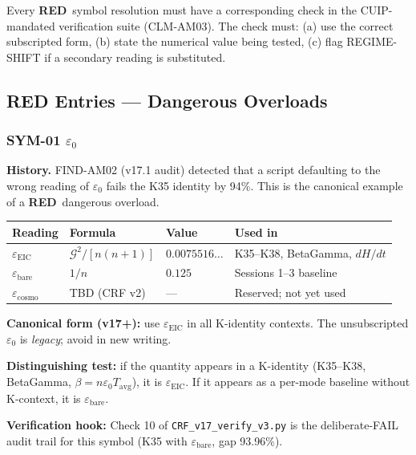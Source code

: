 \documentclass[12pt, a4paper]{article}
\newcommand{\TRED}{\textcolor{redframe}{\textbf{RED}}}
\begin{document}
\begin{rulebox}[title={RULE-05: Verification Suite Hook}]
Every \TRED\ symbol resolution must have a corresponding check in
the CUIP-mandated verification suite (CLM-AM03). The check must:
(a) use the correct subscripted form, (b) state the numerical value
being tested, (c) flag REGIME-SHIFT if a secondary reading is
substituted.
\end{rulebox}

\subsection{RED Entries — Dangerous Overloads}

\subsubsection*{SYM-01 \quad $\varepsilon_0$}

\begin{redbox}[title={SYM-01 \textmd{---} $\varepsilon_0$ \textmd{(three readings)}}]
\textbf{History.} FIND-AM02 (v17.1 audit) detected that a script
defaulting to the wrong reading of $\varepsilon_0$ fails the K35
identity by 94\%. This is the canonical example of a \TRED\
dangerous overload.

\medskip
\renewcommand{\arraystretch}{1.35}
\begin{tabular}{p{3.0cm} p{3.8cm} p{2.2cm} p{3.5cm}}
\toprule
\textbf{Reading} & \textbf{Formula} &
\textbf{Value} & \textbf{Used in}\\
\midrule
$\varepsilon_{\text{EIC}}$ &
  $\mathcal{G}^2/[n(n+1)]$ &
  $0.0075516\ldots$ &
  K35--K38, BetaGamma, $dH/dt$\\
$\varepsilon_{\text{bare}}$ &
  $1/n$ &
  $0.125$ &
  Sessions 1--3 baseline\\
$\varepsilon_{\text{cosmo}}$ &
  TBD (CRF v2) &
  --- &
  Reserved; not yet used\\
\bottomrule
\end{tabular}

\medskip
\textbf{Canonical form (v17+):} use $\varepsilon_{\text{EIC}}$ in
all K-identity contexts. The unsubscripted $\varepsilon_0$ is
\emph{legacy}; avoid in new writing.

\textbf{Distinguishing test:} if the quantity appears in a K-identity
(K35--K38, BetaGamma, $\beta = n\varepsilon_0 T_{\text{avg}}$),
it is $\varepsilon_{\text{EIC}}$. If it appears as a per-mode
baseline without K-context, it is $\varepsilon_{\text{bare}}$.

\textbf{Verification hook:}
Check 10 of \texttt{CRF\_v17\_verify\_v3.py} is the deliberate-FAIL
audit trail for this symbol (K35 with $\varepsilon_{\text{bare}}$,
gap 93.96\%).
\end{redbox}
\end{document}
